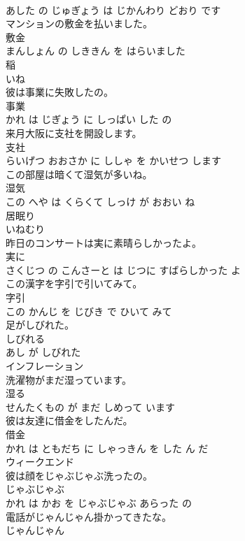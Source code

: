 \documentclass[8pt]{extreport}
\begin{document}
\begin{CJK}{UTF8}{min}
\\	あした の じゅぎょう は じかんわり どおり です			
\\	マンションの敷金を払いました。	
\\	敷金 
\\	まんしょん の しききん を はらいました			
\\	稲	
\\	いね			
\\	彼は事業に失敗したの。	
\\	事業 
\\	かれ は じぎょう に しっぱい した の			
\\	来月大阪に支社を開設します。	
\\	支社 
\\	らいげつ おおさか に ししゃ を かいせつ します			
\\	この部屋は暗くて湿気が多いね。	
\\	湿気 
\\	この へや は くらくて しっけ が おおい ね			
\\	居眠り	
\\	いねむり			
\\	昨日のコンサートは実に素晴らしかったよ。	
\\	実に 
\\	さくじつ の こんさーと は じつに すばらしかった よ			
\\	この漢字を字引で引いてみて。	
\\	字引 
\\	この かんじ を じびき で ひいて みて			
\\	足がしびれた。	
\\	しびれる 
\\	あし が しびれた			
\\	インフレーション	
\\	洗濯物がまだ湿っています。	
\\	湿る 
\\	せんたくもの が まだ しめって います			
\\	彼は友達に借金をしたんだ。	
\\	借金 
\\	かれ は ともだち に しゃっきん を した ん だ			
\\	ウィークエンド	
\\	彼は顔をじゃぶじゃぶ洗ったの。	
\\	じゃぶじゃぶ 
\\	かれ は かお を じゃぶじゃぶ あらった の			
\\	電話がじゃんじゃん掛かってきたな。	
\\	じゃんじゃん 

\end{CJK}
\end{document}
